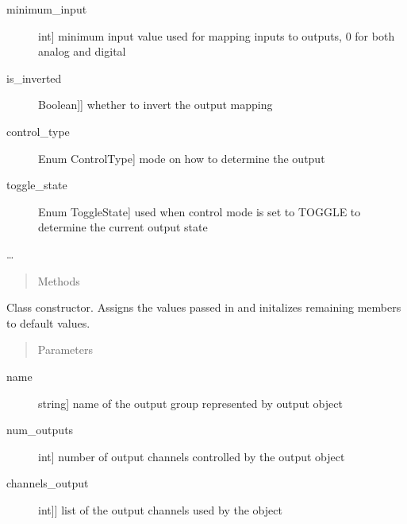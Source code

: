 \documentclass[letterpaper,10pt,english]{sphinxmanual}
\begin{document}
\begin{fulllineitems}
\begin{description}
\item[{minimum\_input}] \leavevmode{[}int{]}
\sphinxAtStartPar
minimum input value used for mapping inputs to outputs, 0 for both analog and digital

\item[{is\_inverted}] \leavevmode{[}{[}Boolean{]}{]}
\sphinxAtStartPar
whether to invert the output mapping

\item[{control\_type}] \leavevmode{[}Enum ControlType{]}
\sphinxAtStartPar
mode on how to determine the output

\item[{toggle\_state}] \leavevmode{[}Enum ToggleState{]}
\sphinxAtStartPar
used when control mode is set to TOGGLE to determine the current output state

\end{description}

\sphinxAtStartPar
…
\begin{quote}\begin{description}
\item[{Methods}] \leavevmode
\end{description}\end{quote}

\begin{fulllineitems}
\label{\detokenize{base:OutputObject.OutputObject.__init__}}
\sphinxAtStartPar
Class constructor. Assigns the values passed in and initalizes remaining members to default values.
\begin{quote}\begin{description}
\item[{Parameters}] \leavevmode
\end{description}\end{quote}
\begin{description}
\item[{name}] \leavevmode{[}string{]}
\sphinxAtStartPar
name of the output group represented by output object

\item[{num\_outputs}] \leavevmode{[}int{]}
\sphinxAtStartPar
number of output channels controlled by the output object

\item[{channels\_output}] \leavevmode{[}{[}int{]}{]}
\sphinxAtStartPar
list of the output channels used by the object


\end{description}
\end{fulllineitems}
\end{fulllineitems}
\end{document}
